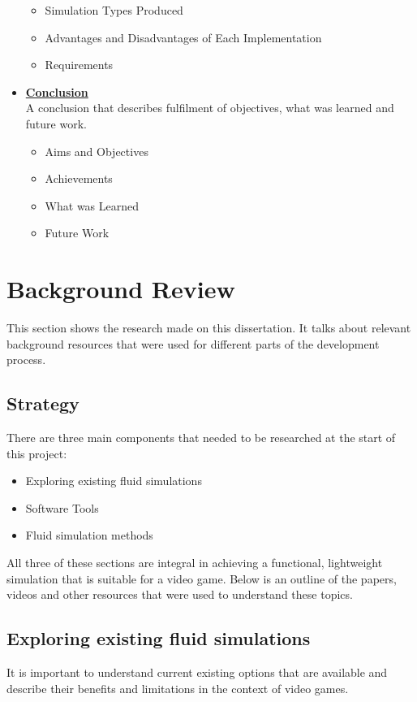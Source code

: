 \documentclass[a4paper, 12pt]{article}
\begin{document}
\begin{itemize}
\begin{itemize}
            \item Simulation Types Produced
            \item Advantages and Disadvantages of Each Implementation
            \item Requirements
        \end{itemize}
        \item \hyperref[sec:conclusion]{\textbf{Conclusion}} \\
        A conclusion that describes fulfilment of objectives, what was learned and future work.
        \begin{itemize}
            \item Aims and Objectives
            \item Achievements
            \item What was Learned
            \item Future Work
        \end{itemize}
    \end{itemize}

    \newpage

    \section{Background Review}
    \label{sec:backgroundreview}
    This section shows the research made on this dissertation. It talks about relevant background resources that were used for different parts of the development process.
    
    \subsection{Strategy}
    There are three main components that needed to be researched at the start of this project:
    \begin{itemize}
        \item Exploring existing fluid simulations
        \item Software Tools
        \item Fluid simulation methods
    \end{itemize}
    \sloppy
    All three of these sections are integral in achieving a functional, lightweight simulation that is suitable for a video game. Below is an outline of the papers, videos and other resources that were used to understand these topics.

    \subsection{Exploring existing fluid simulations}
    It is important to understand current existing options that are available and describe their benefits and limitations in the context of video games.
\end{document}
